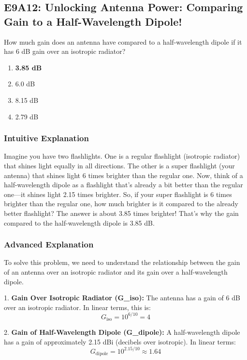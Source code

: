 \subsection{E9A12: Unlocking Antenna Power: Comparing Gain to a Half-Wavelength Dipole!}

\begin{tcolorbox}[colback=gray!10!white,colframe=black!75!black,title=\textbf{Question E9A12}]
How much gain does an antenna have compared to a half-wavelength dipole if it has 6 dB gain over an isotropic radiator?
\begin{enumerate}[label=\Alph*.]
    \item \textbf{3.85 dB}
    \item 6.0 dB
    \item 8.15 dB
    \item 2.79 dB
\end{enumerate}
\end{tcolorbox}

\subsubsection*{Intuitive Explanation}
Imagine you have two flashlights. One is a regular flashlight (isotropic radiator) that shines light equally in all directions. The other is a super flashlight (your antenna) that shines light 6 times brighter than the regular one. Now, think of a half-wavelength dipole as a flashlight that’s already a bit better than the regular one—it shines light 2.15 times brighter. So, if your super flashlight is 6 times brighter than the regular one, how much brighter is it compared to the already better flashlight? The answer is about 3.85 times brighter! That’s why the gain compared to the half-wavelength dipole is 3.85 dB.

\subsubsection*{Advanced Explanation}
To solve this problem, we need to understand the relationship between the gain of an antenna over an isotropic radiator and its gain over a half-wavelength dipole. 

1. \textbf{Gain Over Isotropic Radiator (G\_iso):} The antenna has a gain of 6 dB over an isotropic radiator. In linear terms, this is:
   \[
   G_{\text{iso}} = 10^{6/10} = 4
   \]

2. \textbf{Gain of Half-Wavelength Dipole (G\_dipole):} A half-wavelength dipole has a gain of approximately 2.15 dBi (decibels over isotropic). In linear terms:
   \[
   G_{\text{dipole}} = 10^{2.15/10} \approx 1.64
   \]

